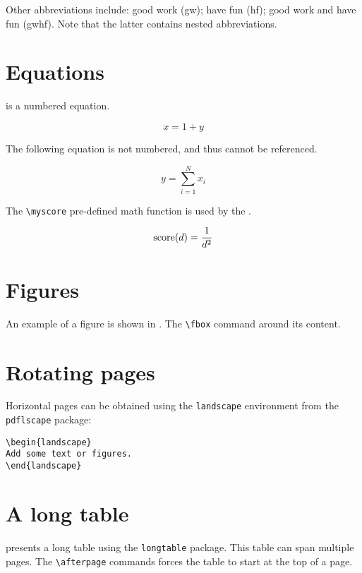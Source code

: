 Other abbreviations include: good work (\acrshort{gw}); have fun (\acrshort{hf}); good work and have fun (\acrshort{gwhf}). Note that the latter contains nested abbreviations.

\section{Equations}
\label{sec:equations}

 is a numbered equation.

\begin{equation}
\label{eq:example1}
x = 1 + y
\end{equation}

The following equation is not numbered, and thus cannot be referenced.

\begin{equation*}
y = \sum_{i=1}^{N}{x_i}
\end{equation*}

The \verb+\myscore+ pre-defined math function is used by the .

\begin{equation}
\label{eq:example2}
\operatorname{score}(d) = \frac{1}{d^2}
\end{equation}

\section{Figures}
\label{sec:figures}

An example of a figure is shown in . The \verb+\fbox+ command  around its content.



\section{Rotating pages}
\label{sec:rotating-pages}

Horizontal pages can be obtained using the \verb+landscape+ environment  from the \verb+pdflscape+ package:

\begin{verbatim}
\begin{landscape}
Add some text or figures.
\end{landscape}
\end{verbatim}

\section{A long table}
\label{sec:a-long-table}

 presents a long table using the \verb+longtable+ package. This table can span multiple pages. The \verb+\afterpage+ commands forces the table to start at the top of a page.

\afterpage{}
